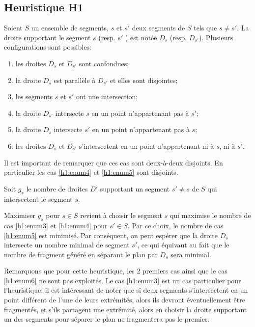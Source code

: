 \subsection{Heuristique H1}
Soient $S$ un ensemble de segments, $s$ et $s'$ deux segments
de $S$ tels que $s \ne s'$. La droite supportant le segment $s$ (resp. $s'$
) est notée $D_s$ (resp. $D_{s'}$).
Plusieurs configurations sont possibles:
\begin{enumerate}
\item les droites  $D_s$ et  $D_{s'}$ sont confondues; \label{h1:enum1}
\item la droite $D_s$ est parallèle à $D_{s'} $ et elles sont disjointes; \label{h1:enum2}
\item les segments $s$ et $s'$ ont une intersection; \label{h1:enum3}
\item la droite $D_{s'}$ intersecte $s$ en un point
  n'appartenant pas à $s'$;\label{h1:enum4}
\item la droite $D_{s}$ intersecte $s'$ en un point
  n'appartenant pas à $s$; \label{h1:enum5}
\item les droites $D_s$ et $D_{s'}$ s'intersectent en un point n'appartenant ni
  à $s$, ni à $s'$. \label{h1:enum6}
\end{enumerate}

Il est important de remarquer que ces cas sont deux-à-deux disjoints.
En particulier les cas \ref{h1:enum4} et \ref{h1:enum5} sont disjoints.

Soit $g_s$ le nombre de droites $D'$ supportant un segment $s' \neq s$
de $S$ qui intersectent le segment $s$.

Maximiser $g_s$ pour $s \in S$ revient à choisir le segment $s$ qui maximise
le nombre de cas \ref{h1:enum3} et \ref{h1:enum4} pour $s' \in S$.
Par ce choix, le nombre de cas \ref{h1:enum5} est minimisé.
Par conséquent, on peut espérer que la droite $D_s$ intersecte un
nombre minimal de segment $s'$, ce qui équivaut au fait que le
nombre de fragment généré en séparant le plan par $D_s$ sera minimal.

Remarquons que pour cette heuristique, les 2 premiers cas ainsi que
le cas \ref{h1:enum6} ne sont pas exploités.
Le cas \ref{h1:enum3} est un cas particulier pour l'heuristique;
il est intéressant de noter que si deux segments s'intersectent
en un point différent de l'une de leurs extrémités, alors ils devront
éventuellement être fragmentés, et s'ils partagent une extrémité, alors
en choisir la droite supportant un des segments pour séparer le plan ne
fragmentera pas le premier.

